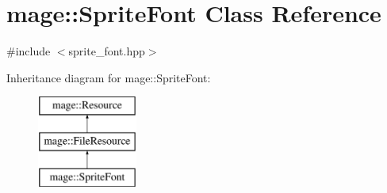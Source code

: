 \hypertarget{classmage_1_1_sprite_font}{}\section{mage\+:\+:Sprite\+Font Class Reference}
\label{classmage_1_1_sprite_font}


{\ttfamily \#include $<$sprite\+\_\+font.\+hpp$>$}

Inheritance diagram for mage\+:\+:Sprite\+Font\+:\begin{figure}[H]
\begin{center}
\leavevmode
\includegraphics[height=3.000000cm]{classmage_1_1_sprite_font}
\end{center}
\end{figure}
